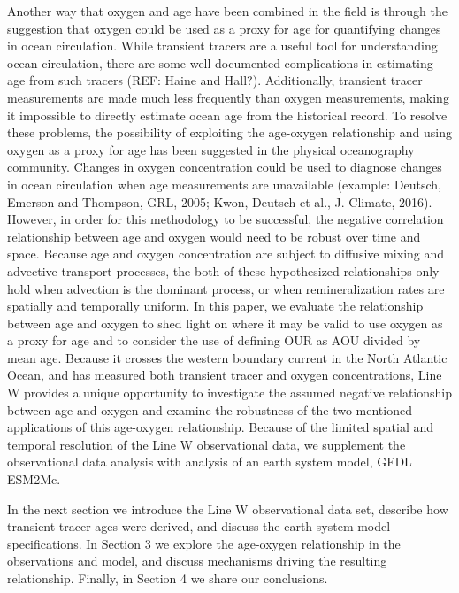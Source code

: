 Another way that oxygen and age have been combined in the field is through the suggestion that oxygen could be used as a proxy for age for quantifying changes in ocean circulation. While transient tracers are a useful tool for understanding ocean circulation, there are some well-documented complications in estimating age from such tracers (REF: Haine and Hall?). Additionally, transient tracer measurements are made much less frequently than oxygen measurements, making it impossible to directly estimate ocean age from the historical record. To resolve these problems, the possibility of exploiting the age-oxygen relationship and using oxygen as a proxy for age has been suggested in the physical oceanography community. Changes in oxygen concentration could be used to diagnose changes in ocean circulation when age measurements are unavailable (example: Deutsch, Emerson and Thompson, GRL, 2005; Kwon, Deutsch et al., J. Climate, 2016). However, in order for this methodology to be successful, the negative correlation relationship between age and oxygen would need to be robust over time and space.
Because age and oxygen concentration are subject to diffusive mixing and advective transport processes, the both of these hypothesized relationships only hold when advection is the dominant process, or when remineralization rates are spatially and temporally uniform. In this paper, we evaluate the relationship between age and oxygen to shed light on where it may be valid to use oxygen as a proxy for age and to consider the use of defining OUR as AOU divided by mean age. Because it crosses the western boundary current in the North Atlantic Ocean, and has measured both transient tracer and oxygen concentrations, Line W provides a unique opportunity to investigate the assumed negative relationship between age and oxygen and examine the robustness of the two mentioned applications of this age-oxygen relationship. Because of the limited spatial and temporal resolution of the Line W observational data, we supplement the observational data analysis with analysis of an earth system model, GFDL ESM2Mc.

In the next section we introduce the Line W observational data set, describe how transient tracer ages were derived, and discuss the earth system model specifications. In Section 3 we explore the age-oxygen relationship in the observations and model, and discuss mechanisms driving the resulting relationship. Finally, in Section 4 we share our conclusions.



